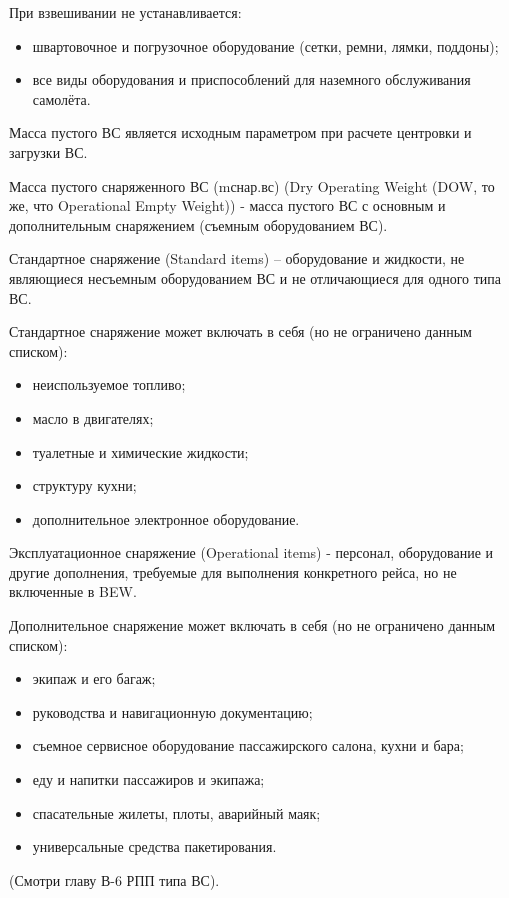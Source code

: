 При взвешивании не устанавливается:
\begin{itemize}
    \item швартовочное и погрузочное оборудование (сетки, ремни, лямки, поддоны);
    \item все виды оборудования и приспособлений для наземного обслуживания самолёта. 
\end{itemize}
	
Масса пустого ВС является исходным параметром при расчете центровки и загрузки ВС.

Масса пустого снаряженного ВС (mснар.вс) (Dry Operating Weight (DOW, то же, что Operational Empty Weight)) - масса пустого ВС с основным и дополнительным снаряжением (съемным оборудованием ВС).

Стандартное снаряжение (Standard items) – оборудование и жидкости, не являющиеся несъемным оборудованием ВС и не отличающиеся для одного типа ВС.

Стандартное снаряжение может включать в себя (но не ограничено данным списком):
\begin{itemize}
    \item неиспользуемое топливо;
    \item масло в двигателях;
    \item туалетные и химические жидкости;
    \item структуру кухни;
    \item дополнительное электронное оборудование.
\end{itemize}

Эксплуатационное снаряжение (Operational items) - персонал, оборудование и другие дополнения, требуемые для выполнения конкретного рейса, но не включенные в BEW.

Дополнительное снаряжение может включать в себя (но не ограничено данным списком):
\begin{itemize}
    \item экипаж и его багаж;
    \item руководства и навигационную документацию;
    \item съемное сервисное оборудование пассажирского салона, кухни и бара;
    \item еду и напитки пассажиров и экипажа;
    \item спасательные жилеты, плоты, аварийный маяк;
    \item универсальные средства пакетирования.
\end{itemize}
(Смотри главу В-6 РПП типа ВС).

